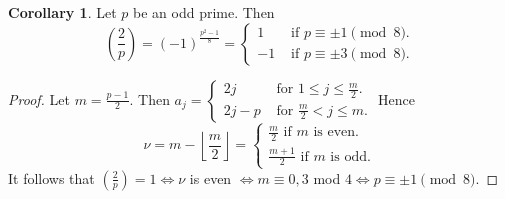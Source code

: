 \documentclass{article}
\theoremstyle{definition}
\newtheorem{cor}[theorem]{Corollary}
\begin{document}
\begin{cor}
    Let $p$ be an odd prime. Then $$\left(\frac{2}{p}\right) = (-1)^{\frac{p^2-1}{8}}=  \begin{cases}
        1 &\text{ if } p \equiv  \pm 1 \pmod{8}.\\
        -1 &\text{ if } p \equiv  \pm 3 \pmod{8}.
    \end{cases}$$
\end{cor}
\begin{proof}
    Let $m =\frac{p-1}{2}$. Then $a_j = \begin{cases}
        2j &\text{ for } 1\le j\le \frac{m}{2}. \\
        2j-p &\text{ for } \frac{m}{2}< j \le m.
    \end{cases}$
    Hence $$\nu = m - \left\lfloor \frac{m}{2} \right\rfloor = \begin{cases}
        \frac{m}{2} \text{ if } m \text{ is even.}\\
        \frac{m+1}{2}\text{ if } m \text{ is odd.}
    \end{cases}$$
    It follows that $\left(\frac{2}{p}\right) = 1 \iff \nu$ is even $\iff m \equiv 0,3$ mod $4 \iff p \equiv \pm 1 \pmod{8}$.
\end{proof}
\vspace{1mm}
\end{document}
